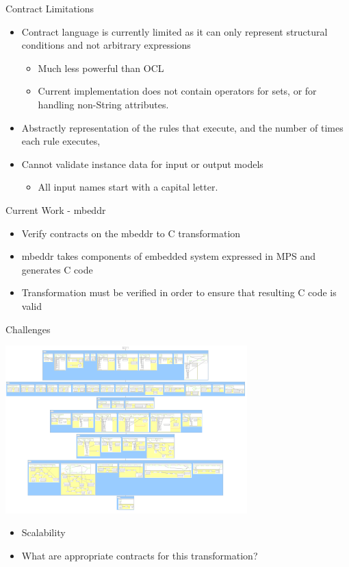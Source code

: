 \documentclass[xcolor=dvipsnames, 12pt, handout]{beamer}
\begin{document}
\begin{frame}{Contract Limitations}

\begin{itemize}
\item Contract language is currently limited
as it can only represent structural conditions and not
arbitrary expressions
\begin{itemize}
\item Much less powerful than OCL
\item  Current implementation does not contain
operators for sets, or for handling non-String attributes.
\end{itemize}
\item Abstractly representation of the rules that
execute, and the number of times each rule executes,
\item Cannot validate instance data for input or output models
\begin{itemize}
\item All input names start with a capital
letter.
\end{itemize}
\end{itemize}
\end{frame}


\begin{frame}{Current Work - mbeddr}

\begin{itemize}[<+->]
\item Verify contracts on the mbeddr  to C transformation
\item mbeddr takes components of embedded system expressed in MPS and generates C code
\item Transformation must be verified in order to ensure that resulting C code is valid
\end{itemize}
\end{frame}

\begin{frame}{Challenges}

\begin{center}
\includegraphics[width=0.7\textwidth]{figures/mbeddr}
\end{center}

\begin{itemize}
\item Scalability
\item What are appropriate contracts for this transformation?

\end{itemize}
\end{frame}
\end{document}
